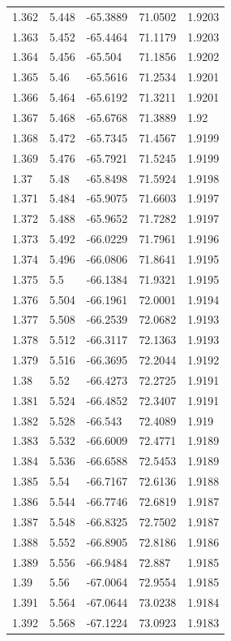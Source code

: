 \begin{tabular}{lllll}
1.362 & 5.448 & -65.3889 & 71.0502 & 1.9203 \\
1.363 & 5.452 & -65.4464 & 71.1179 & 1.9203 \\
1.364 & 5.456 & -65.504 & 71.1856 & 1.9202 \\
1.365 & 5.46 & -65.5616 & 71.2534 & 1.9201 \\
1.366 & 5.464 & -65.6192 & 71.3211 & 1.9201 \\
1.367 & 5.468 & -65.6768 & 71.3889 & 1.92 \\
1.368 & 5.472 & -65.7345 & 71.4567 & 1.9199 \\
1.369 & 5.476 & -65.7921 & 71.5245 & 1.9199 \\
1.37 & 5.48 & -65.8498 & 71.5924 & 1.9198 \\
1.371 & 5.484 & -65.9075 & 71.6603 & 1.9197 \\
1.372 & 5.488 & -65.9652 & 71.7282 & 1.9197 \\
1.373 & 5.492 & -66.0229 & 71.7961 & 1.9196 \\
1.374 & 5.496 & -66.0806 & 71.8641 & 1.9195 \\
1.375 & 5.5 & -66.1384 & 71.9321 & 1.9195 \\
1.376 & 5.504 & -66.1961 & 72.0001 & 1.9194 \\
1.377 & 5.508 & -66.2539 & 72.0682 & 1.9193 \\
1.378 & 5.512 & -66.3117 & 72.1363 & 1.9193 \\
1.379 & 5.516 & -66.3695 & 72.2044 & 1.9192 \\
1.38 & 5.52 & -66.4273 & 72.2725 & 1.9191 \\
1.381 & 5.524 & -66.4852 & 72.3407 & 1.9191 \\
1.382 & 5.528 & -66.543 & 72.4089 & 1.919 \\
1.383 & 5.532 & -66.6009 & 72.4771 & 1.9189 \\
1.384 & 5.536 & -66.6588 & 72.5453 & 1.9189 \\
1.385 & 5.54 & -66.7167 & 72.6136 & 1.9188 \\
1.386 & 5.544 & -66.7746 & 72.6819 & 1.9187 \\
1.387 & 5.548 & -66.8325 & 72.7502 & 1.9187 \\
1.388 & 5.552 & -66.8905 & 72.8186 & 1.9186 \\
1.389 & 5.556 & -66.9484 & 72.887 & 1.9185 \\
1.39 & 5.56 & -67.0064 & 72.9554 & 1.9185 \\
1.391 & 5.564 & -67.0644 & 73.0238 & 1.9184 \\
1.392 & 5.568 & -67.1224 & 73.0923 & 1.9183 \\

\end{tabular}
